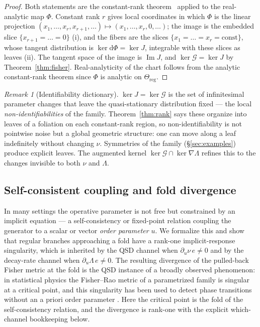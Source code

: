 \documentclass[11pt,reqno]{amsart}
\theoremstyle{plain}
\theoremstyle{definition}
\theoremstyle{remark}
\newtheorem{remark}[theorem]{Remark}
\newcommand{\Reg}{\Theta_{\mathrm{reg}}}
\newcommand{\dd}{\mathrm{d}}
\DeclareMathOperator{\Imm}{Im}
\begin{document}
\begin{proof}
Both statements are the constant-rank theorem~\cite[Thm.~4.12]{Lee2013} applied to
the real-analytic map $\Phi$. Constant rank $r$ gives local coordinates in which
$\Phi$ is the linear projection $(x_1,\dots,x_r,x_{r+1},\dots)\mapsto(x_1,\dots,
x_r,0,\dots)$; the image is the embedded slice $\{x_{r+1}=\dots=0\}$ (i), and the
fibers are the slices $\{x_1=\dots=x_r=\text{const}\}$, whose tangent distribution is
$\ker\dd\Phi=\ker J$, integrable with these slices as leaves (ii). The tangent space
of the image is $\Imm J$, and $\ker\mathcal G=\ker J$ by Theorem~\ref{thm:fisher}.
Real-analyticity of the chart follows from the analytic constant-rank theorem
since $\Phi$ is analytic on $\Reg$.
\end{proof}

\begin{remark}[Identifiability dictionary]
$\ker J=\ker\mathcal G$ is the set of infinitesimal parameter changes that leave the
quasi-stationary distribution fixed --- the local \emph{non-identifiabilities} of
the family. Theorem~\ref{thm:rank} says these organize into leaves of a foliation
on each constant-rank region, so non-identifiability is not pointwise noise but a
global geometric structure: one can move along a leaf indefinitely without
changing $\nu$. Symmetries of the family (\S\ref{sec:examples}) produce explicit
leaves. The augmented kernel $\ker\mathcal G\cap\ker\nabla\Lambda$ refines this to
the changes invisible to both $\nu$ and $\Lambda$.
\end{remark}

\subsection{Self-consistent coupling and fold divergence}\label{sec:fold-divergence}

In many settings the operative parameter is not free but constrained by an
implicit equation --- a self-consistency or fixed-point relation coupling the
generator to a scalar or vector \emph{order parameter} $u$. We formalize this and
show that regular branches approaching a fold have a rank-one implicit-response
singularity, which is inherited by the QSD channel when $\partial_u\nu\,e\neq0$ and
by the decay-rate channel when $\partial_u\Lambda\,e\neq0$. The resulting divergence of
the pulled-back Fisher metric at the fold is the QSD instance of a broadly observed
phenomenon: in statistical physics the Fisher--Rao metric of a parametrized family is
singular at a critical point, and this singularity has been used to detect phase
transitions without an a priori order parameter
\cite{JankeJohnstonKenna2004,Prokopenko2011}. Here the critical point is the fold of the
self-consistency relation, and the divergence is rank-one with the explicit
which-channel bookkeeping below.
\end{document}
